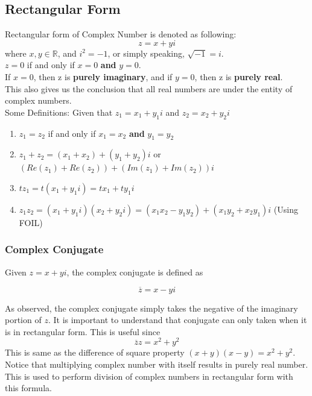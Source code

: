 \documentclass[12pt]{article}
\newcommand{\R}{\mathbb{R}}
\begin{document}
\subsection{Rectangular Form}
Rectangular form of Complex Number is denoted as following:\\
\begin{equation}
z = x+yi
\end{equation}
where $x,y\in \R$, and $i^2 = -1$, or simply speaking, $\sqrt{-1} = i$.\\
$z = 0$ if and only if $x = 0$ \textbf{and} $y = 0$.\\
If $x = 0$, then z is \textbf{purely imaginary}, and if $y = 0$, then z is \textbf{purely real}.\\
This also gives us the conclusion that all real numbers are under the entity of complex numbers. \\
Some Definitions: Given that $z_1 = x_1 + y_1i$ and $z_2 = x_2+y_2i$
\begin{enumerate}
\item $z_1 = z_2$ if and only if $x_1 = x_2$ \textbf{and} $y_1 = y_2$
\item $z_1 + z_2 = (x_1 +  x_2) + (y_1+y_2)i$ or $(Re(z_1) + Re(z_2)) + (Im(z_1)+Im(z_2))i$
\item $tz_1 = t(x_1+y_1i) = tx_1 + ty_1i$
\item $z_1z_2 = (x_1+y_1i)(x_2+y_2i)=(x_1x_2-y_1y_2) + (x_1y_2+x_2y_1)i$ (Using FOIL)
\end{enumerate} \cite{Textbook}

\subsubsection{Complex Conjugate}
Given $z=x+yi$, the complex conjugate is defined as 

\begin{equation}
\overline{z} = x-yi
\end{equation}

As observed, the complex conjugate simply takes the negative of the imaginary portion of $z$. It is important to understand that conjugate can only taken when it is in rectangular form.  This is useful since 
\begin{equation}
\overline{z}z = x^2 + y^2
\end{equation}
This is same as the difference of square property $(x+y)(x-y) = x^2 + y^2$. Notice that multiplying complex number with itself results in purely real number. This is used to perform division of complex numbers in rectangular form with this formula.\\
\end{document}
